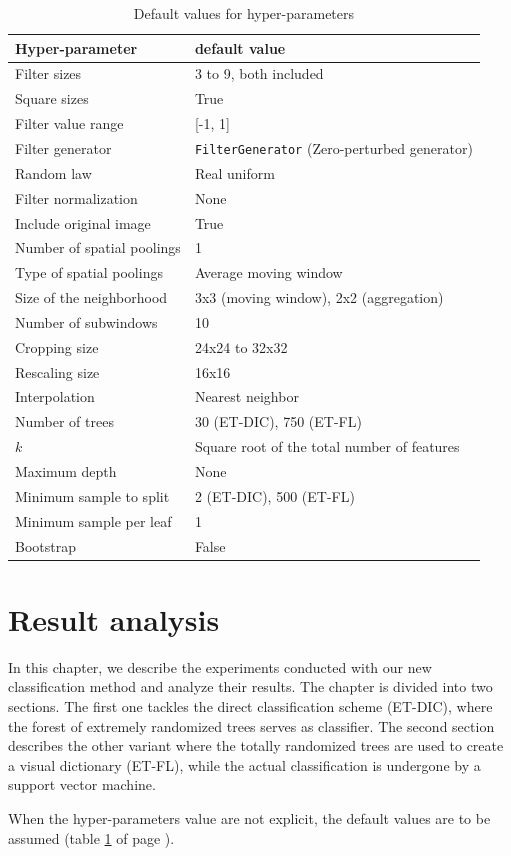 \documentclass[a4paper]{report}
\begin{document}
	\begin{table}
		\centering
			\begin{tabular}{l|l}
			\hline
			Hyper-parameter & default value \\
			\hline
			Filter sizes & 3 to 9, both included\\
			Square sizes & True \\
			Filter value range & [-1, 1] \\
			Filter generator & \texttt{FilterGenerator} (Zero-perturbed generator)\\
			Random law & Real uniform\\
			Filter normalization & None\\
			Include original image & True\\
			Number of spatial poolings & 1 \\
			Type of spatial poolings & Average moving window \\
			Size of the neighborhood & 3x3 (moving window), 2x2 (aggregation)\\
			Number of subwindows & 10 \\
			Cropping size & 24x24 to 32x32 \\
			Rescaling size & 16x16 \\
			Interpolation & Nearest neighbor \\
			Number of trees & 30 (ET-DIC), 750 (ET-FL) \\
			$k$ & Square root of the total number of features \\
			Maximum depth & None \\
			Minimum sample to split & 2 (ET-DIC), 500 (ET-FL) \\
			Minimum sample per leaf & 1 \\
			Bootstrap & False \\
			\hline
			\end{tabular}
		\caption{Default values for hyper-parameters}
		\label{tab:DefaultValuesForHyperParameters}
	\end{table}
		


\chapter{\label{chap:results}Result analysis}
In this chapter, we describe the experiments conducted with our new classification method and analyze their results. The chapter is divided into two sections. The first one tackles the direct classification scheme (ET-DIC), where the forest of extremely randomized trees serves as classifier. The second section describes the other variant where the totally randomized trees are used to create a visual dictionary (ET-FL), while the actual classification is undergone by a support vector machine.
\par
When the hyper-parameters value are not explicit, the default values are to be assumed (table \ref{tab:DefaultValuesForHyperParameters} of page \pageref{tab:DefaultValuesForHyperParameters}).
\end{document}
